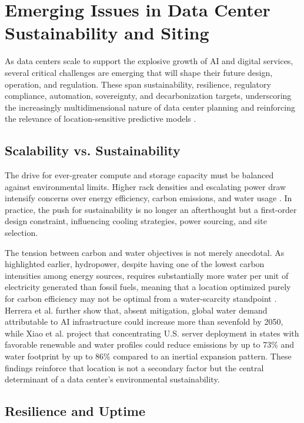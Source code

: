 \documentclass[conference]{IEEEtran}
\begin{document}
\section{Emerging Issues in Data Center Sustainability and Siting}

As data centers scale to support the explosive growth of AI and digital services, several critical challenges are emerging that will shape their future design, operation, and regulation. These span sustainability, resilience, regulatory compliance, automation, sovereignty, and decarbonization targets, underscoring the increasingly multidimensional nature of data center planning and reinforcing the relevance of location-sensitive predictive models \cite{Cruzes2026}.

\subsection{Scalability vs. Sustainability}

The drive for ever-greater compute and storage capacity must be balanced against environmental limits. Higher rack densities and escalating power draw intensify concerns over energy efficiency, carbon emissions, and water usage \cite{Cruzes2026}. In practice, the push for sustainability is no longer an afterthought but a first-order design constraint, influencing cooling strategies, power sourcing, and site selection.

The tension between carbon and water objectives is not merely anecdotal. As highlighted earlier, hydropower, despite having one of the lowest carbon intensities among energy sources, requires substantially more water per unit of electricity generated than fossil fuels, meaning that a location optimized purely for carbon efficiency may not be optimal from a water-scarcity standpoint \cite{Jiang2025WaterWise}. Herrera et al. \cite{Herrera2025} further show that, absent mitigation, global water demand attributable to AI infrastructure could increase more than sevenfold by 2050, while Xiao et al. \cite{Xiao2025NetZero} project that concentrating U.S. server deployment in states with favorable renewable and water profiles could reduce emissions by up to 73\% and water footprint by up to 86\% compared to an inertial expansion pattern. These findings reinforce that location is not a secondary factor but the central determinant of a data center's environmental sustainability.

\subsection{Resilience and Uptime}
\end{document}
